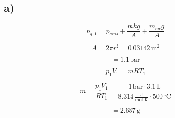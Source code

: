 

\subsection*{a)}

\[
p_{g,1} = p_{amb} + \frac{m k g}{A} + \frac{m_{ew} g}{A}
\]

\[
A = 2 \pi r^2 = 0.03142 \, \text{m}^2
\]

\[
= 1.1 \, \text{bar}
\]

\[
p_1 V_1 = m R T_1
\]

\[
m = \frac{p_1 V_1}{R T_1} = \frac{1 \, \text{bar} \cdot 3.1 \, \text{L}}{8.314 \, \frac{\text{J}}{\text{mol K}} \cdot 500 \, ^\circ \text{C}}
\]

\[
= 2.687 \, \text{g}
\]
